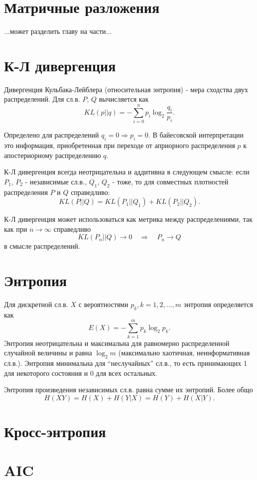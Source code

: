\section{Матричные разложения}

...может разделить главу на части...


\section{К-Л дивергенция}

Дивергенция Кульбака-Лейблера (относительная энтропия) - мера сходства двух распределений. Для сл.в. $P$, $Q$ вычисляется как
$$
KL(p||q) = -\sum_{i=0}^np_i\log_2\frac{q_i}{p_i}.
$$

Определено для распределений $q_i = 0 \Rightarrow p_i=0$.
В байесовской интерпретации это информация, приобретенная при переходе от априорного распределения $p$ к апостериорному распределению $q$.

К-Л дивергенция всегда неотрицательна и аддитивна в следующем смысле: если $P_1$, $P_2$ - независимые сл.в., $Q_1$, $Q_2$ - тоже, то для совместных плотностей распределения $P$ и $Q$ справедливо:
$$
KL(P||Q) =  KL(P_1||Q_1) + KL(P_2||Q_2).
$$

К-Л дивергенция может использоваться как метрика между распределениями, так как при $n \rightarrow \infty$ справедливо
$$
KL(P_n||Q) \rightarrow 0 \quad \Rightarrow \quad P_n \rightarrow Q
$$
в смысле распределений.

\section{Энтропия}

Для дискретной сл.в. $X$ с вероятностями $p_k, k=1, 2, ..., m$ энтропия определяется как
$$
E(X) = -\sum_{k=1}^mp_k\log_2p_k.
$$
Энтропия неотрицательна и максимальна для равномерно распределенной случайной величины и равна $\log_2m$ (максимально хаотичная, неинформативная сл.в.). Энтропия минимальна для ``неслучайных'' сл.в., то есть принимающих 1 для некоторого состояния и 0 для всех остальных.

Энтропия произведения независимых сл.в. равна сумме их энтропий. Более общо
$$
H(XY) = H(X) + H(Y|X) = H(Y) + H(X|Y).
$$


\section{Кросс-энтропия}


\section{AIC}

